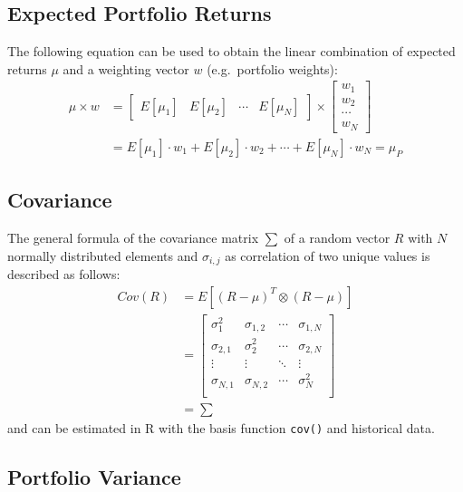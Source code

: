 \documentclass[
  oneside]{book}
\begin{document}
\hypertarget{expected-portfolio-returns}{%
\subsection{Expected Portfolio Returns}\label{expected-portfolio-returns}}

The following equation can be used to obtain the linear combination of expected returns \(\mu\) and a weighting vector \(w\) (e.g.~portfolio weights):
\begin{align*}
 \mu \times w &=
  \begin{bmatrix}
    E[\mu_{1}] & E[\mu_{2}] & \cdots & E[\mu_{N}]
 \end{bmatrix}
  \times 
  \begin{bmatrix}
    w_{1} \\ 
    w_{2} \\
    \cdots \\
    w_{N}  
 \end{bmatrix} \\
 &=
 E[\mu_{1}] \cdot w_1 + E[\mu_{2}] \cdot w_2 + \cdots + E[\mu_{N}] \cdot w_{N} 
 =
 \mu_P
\end{align*}

\hypertarget{covariance}{%
\subsection{Covariance}\label{covariance}}

The general formula of the covariance matrix \(\textstyle\sum\) of a random vector \(R\) with \(N\) normally distributed elements and \(\sigma_{i,j}\) as correlation of two unique values is described as follows:
\begin{align*}
  Cov(R) &= E[(R-\mu)^T \otimes (R-\mu)] \\
  &=   \begin{bmatrix}
    \sigma_1^2 & \sigma_{1,2} & \cdots & \sigma_{1,N} \\
    \sigma_{2, 1} & \sigma_2^2 & \cdots & \sigma_{2, N} \\
    \vdots  & \vdots & \ddots & \vdots \\
    \sigma_{N, 1} & \sigma_{N, 2} & \cdots & \sigma_N^2 \\
 \end{bmatrix}\\
  &=\textstyle\sum
\end{align*}
and can be estimated in R with the basis function \texttt{cov()} and historical data.

\hypertarget{portvar}{%
\subsection{Portfolio Variance}\label{portvar}}
\end{document}
